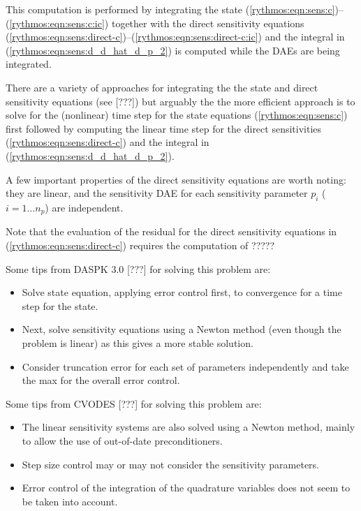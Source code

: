\documentclass[pdf,ps2pdf,11pt]{SANDreport}
\begin{document}
This computation is performed by integrating the state
(\ref{rythmos:eqn:sens:c})--(\ref{rythmos:eqn:sens:c:ic}) together with the
direct sensitivity equations
(\ref{rythmos:eqn:sens:direct-c})--(\ref{rythmos:eqn:sens:direct-c:ic}) and
the integral in (\ref{rythmos:eqn:sens:d_d_hat_d_p_2}) is computed while the
DAEs are being integrated.

There are a variety of approaches for integrating the the state and direct
sensitivity equations (see [???]) but arguably the the more efficient approach
is to solve for the (nonlinear) time step for the state equations
(\ref{rythmos:eqn:sens:c}) first followed by computing the linear time step
for the direct sensitivities (\ref{rythmos:eqn:sens:direct-c}) and the
integral in (\ref{rythmos:eqn:sens:d_d_hat_d_p_2}).

A few important properties of the direct sensitivity equations are worth
noting: they are linear, and the sensitivity DAE for each sensitivity
parameter $p_i$ ($i=1\ldots{}n_p$) are independent.

Note that the evaluation of the residual for the direct sensitivity equations
in (\ref{rythmos:eqn:sens:direct-c}) requires the computation of ?????

Some tips from DASPK 3.0 [???] for solving this problem are:
\begin{itemize}
%
{}\item Solve state equation, applying error control first, to convergence for a
time step for the state.
%
{}\item Next, solve sensitivity equations using a Newton method (even though the problem
is linear) as this gives a more stable solution.
%
{}\item Consider truncation error for each set of parameters independently and take
the max for the overall error control.
%
\end{itemize}

Some tips from CVODES [???] for solving this problem are:
\begin{itemize}
%
{}\item The linear sensitivity systems are also solved using a Newton method,
mainly to allow the use of out-of-date preconditioners.
%
{}\item Step size control may or may not consider the sensitivity parameters.
%
{}\item Error control of the integration of the quadrature variables does
not seem to be taken into account.
%
\end{itemize}
\end{document}
